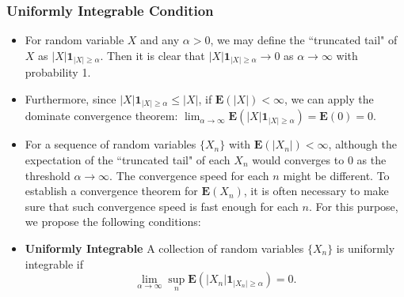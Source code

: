 \documentclass[handout]{beamer}
\newcommand{\BE}{\mathbf{E}}
\newcommand{\BI}{\mathbf{1}}
\begin{document}
\frame
{
  \frametitle{Uniformly Integrable Condition} 

   \begin{itemize}
   
  
                \item<1-> For random variable $X$ and any $\alpha>0$, we may define the ``truncated tail" of $X$ as $|X|\BI_{|X|\geq \alpha}$. Then it is clear that $|X|\BI_{|X|\geq \alpha}\rightarrow 0$ as $\alpha\rightarrow \infty$ with probability 1. 
                \item<2-> Furthermore, since $|X|\BI_{|X|\geq \alpha}\leq |X|$, if $\BE(|X|)<\infty$, we can apply the dominate convergence theorem: $\lim_{\alpha\rightarrow \infty}\BE(|X|\BI_{|X|\geq \alpha})=\BE(0)=0$. 
                
\item<3-> For a sequence of random variables $\{X_n\}$ with $\BE(|X_n|)<\infty$, although the expectation of the ``truncated tail" of each $X_n$ would converges to 0 as the threshold $\alpha\rightarrow \infty$. The convergence speed for each $n$ might be different. To establish a convergence theorem for $\BE(X_n)$, it is often necessary to make sure that such convergence speed is fast enough for each $n$. For this purpose, we propose the following conditions:
                                
                                
                                                               
                               \item<4-> \textbf{Uniformly Integrable} A collection of random variables $\{X_n\}$ is uniformly integrable if 
                               $$\lim_{\alpha\rightarrow \infty} \sup_n \BE(|X_n| \BI_{|X_n|\geq \alpha})=0.$$
                                                             
                               
                              \end{itemize}
}
\end{document}
